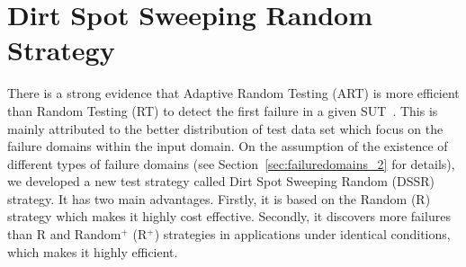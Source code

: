 
\chapter{Dirt Spot Sweeping Random Strategy}
\label{chap:DSSR}








There is a strong evidence that Adaptive Random Testing (ART) is more efficient than Random Testing (RT) to detect the first failure in a given SUT~\cite{chen2005adaptive}. This is mainly attributed to the better distribution of test data set which focus on the failure domains within the input domain. On the assumption of the existence of different types of failure domains (see Section~\ref{sec:failuredomains_2} for details), we developed a new test strategy called Dirt Spot Sweeping Random (DSSR) strategy. It has two main advantages. Firstly, it is based on the Random (R) strategy which makes it highly cost effective. Secondly, it discovers more failures than R and Random$^+$ (R$^+$) strategies in applications under identical conditions, which makes it highly efficient.  

